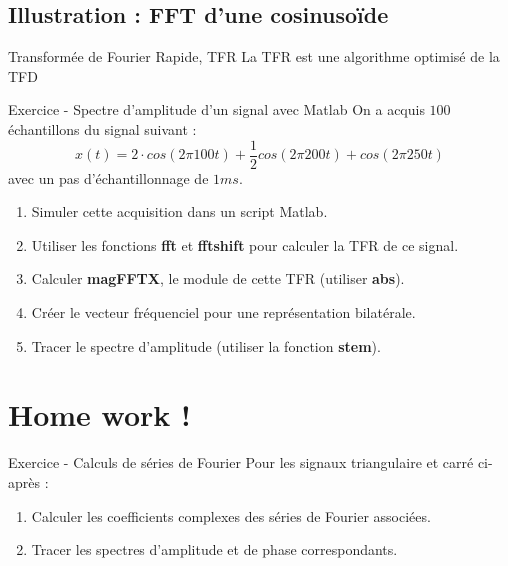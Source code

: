 \documentclass[a4paper,11pt]{beamer}
\newcounter{exampleBlockCounter}
\begin{document}
\subsection{Illustration : FFT d'une cosinusoïde}
\begin{frame}
\begin{block}{Transformée de Fourier Rapide, TFR}
\center
La TFR est une algorithme optimisé de la TFD
\end{block}
\begin{exampleblock}{Exercice  - Spectre d'amplitude
d'un signal avec Matlab}
\justify
On a acquis $100$ échantillons du signal suivant : 
$$
x(t) = 2\cdot cos(2\pi 100 t) + \frac{1}{2}cos(2\pi 200 t) + cos(2\pi 250 t)
$$ 
avec un pas d'échantillonnage de $1ms$.
\begin{enumerate}
  \item Simuler cette acquisition dans un script Matlab.
  \item Utiliser les fonctions \textbf{fft} et \textbf{fftshift} pour calculer
  la TFR de ce signal.
  \item Calculer \textbf{magFFTX}, le module de cette TFR (utiliser
  \textbf{abs}).
  \item Créer le vecteur fréquenciel pour une représentation bilatérale. 
  \item Tracer le spectre d'amplitude (utiliser la fonction \textbf{stem}).
\end{enumerate}
\end{exampleblock}
\end{frame}

\section{Home work !}
\begin{frame}
\begin{exampleblock}{Exercice  - Calculs de séries
de Fourier}
\justifying
Pour les signaux triangulaire et carré ci-après :
\begin{enumerate}
  \item Calculer les coefficients complexes des séries de Fourier associées.
  \item Tracer les spectres d'amplitude et de phase correspondants.
\end{enumerate} 
\end{exampleblock}
\end{frame}
 
\end{document}
